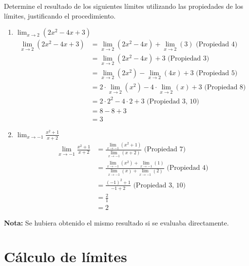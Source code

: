 \ex{} {
    Determine el resultado de los siguientes límites utilizando las propiedades 
    de los límites, justificando el procedimiento. \\

    \begin{enumerate}
        \item $\lim_{x \to 2} (2x^2 - 4x + 3)$ \\
            \begin{align*}
                \lim_{x \to 2} (2x^2 - 4x + 3) &= \lim_{x \to 2} (2x^2 - 4x) + \lim_{x \to 2} (3) \text{     (Propiedad 4)} \\
                &= \lim_{x \to 2} (2x^2 - 4x) + 3 \text{     (Propiedad 3)} \\
                &= \lim_{x \to 2} (2x^2) - \lim_{x \to 2} (4x) + 3 \text{     (Propiedad 5)} \\
                &= 2 \cdot \lim_{x \to 2} (x^2) - 4 \cdot \lim_{x \to 2} (x) + 3 \text{     (Propiedad 8)} \\
                &= 2 \cdot 2^2 - 4 \cdot 2 + 3 \text{     (Propiedad 3, 10)} \\
                &= 8 - 8 + 3 \\
                &= 3
            \end{align*}

        \item $\lim_{x \to -1} \frac{x^2+1}{x+2}$ \\
            \begin{align*}
                \lim_{x \to -1} \frac{x^2+1}{x+2} &= \frac{\lim_{x \to -1} (x^2+1)}{\lim_{x \to -1} (x+2)} \text{     (Propiedad 7)} \\
                &= \frac{\lim_{x \to -1} (x^2) + \lim_{x \to -1} (1)}{\lim_{x \to -1} (x) + \lim_{x \to -1} (2)} \text{     (Propiedad 4)} \\
                &= \frac{(-1)^2 + 1}{-1 + 2} \text{     (Propiedad 3, 10)} \\
                &= \frac{2}{1} \\
                &= 2
            \end{align*}
    \end{enumerate}

    \textbf{Nota:} Se hubiera obtenido el mismo resultado si se evaluaba directamente.
}

\section{Cálculo de límites}

